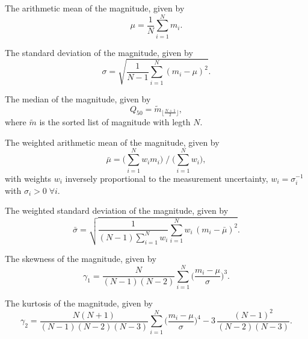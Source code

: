 \begin{enumerate}

 The arithmetic mean of the magnitude, given by
\begin{equation}\mu = \frac{1}{N} \sum\limits_{i=1}^{N} m_i.\end{equation}

 The standard deviation of the magnitude, given by
\begin{equation}\sigma = \sqrt{\frac{1}{N-1} \sum_{i=1}^N (m_i - \mu)^2}.\end{equation}

 The median of the magnitude, given by
\begin{equation}Q_{50} = \tilde m_{\lfloor\frac{N+1}{2}\rfloor},\end{equation}
where $\tilde m$ is the sorted list of magnitude with legth $N$.

 The weighted arithmetic mean of the magnitude, given by
\begin{equation}\bar \mu = \big(\sum\limits_{i=1}^{N} w_i m_i\big) \; / \; \big(\sum\limits_{i=1}^{N} w_i\big),\end{equation}
with weights $w_i$ inversely proportional to the measurement uncertainty, \ie $w_i = \sigma_i^{-1}$ with $\sigma_i > 0 \; \forall i$.

 The weighted standard deviation of the magnitude, given by
\begin{equation}\bar \sigma = \sqrt{\frac{1}{(N-1) \sum\limits_{i=1}^{N} w_i} \sum_{i=1}^N w_i \, ( m_i - \bar \mu)^2}.\end{equation}

 The skewness of the magnitude, given by
\begin{equation}\gamma_1 = \frac{N}{(N-1)(N-2)} \sum\limits_{i=1}^N \big( \frac{m_i - \mu}{\sigma} \big)^3.\end{equation}

 The kurtosis of the magnitude, given by
\begin{equation}\gamma_2 = \frac{N(N+1)}{(N-1)(N-2)(N-3)} \sum\limits_{i=1}^N \big( \frac{m_i - \mu}{\sigma} \big)^4 - 3 \, \frac{(N-1)^2}{(N-2)(N-3)}.\end{equation}


\end{enumerate}
